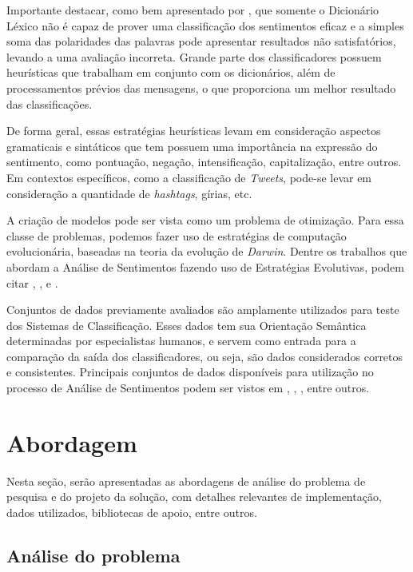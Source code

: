 \documentclass[12pt]{article}
\begin{document}
Importante destacar, como bem apresentado por \cite{araujo2013metodos}, que somente o Dicionário Léxico não é capaz de prover uma classificação dos sentimentos eficaz e a simples soma das polaridades das palavras pode apresentar resultados não satisfatórios, levando a uma avaliação incorreta. Grande parte dos classificadores possuem heurísticas que trabalham em conjunto com os dicionários, além de processamentos prévios das mensagens, o que proporciona um melhor resultado das classificações.

De forma geral, essas estratégias heurísticas levam em consideração aspectos gramaticais e sintáticos que tem possuem uma importância na expressão do sentimento, como pontuação, negação, intensificação, capitalização, entre outros. Em contextos específicos, como a classificação de \emph{Tweets}, pode-se levar em consideração a quantidade de \emph{hashtags}, gírias, etc.

A criação de modelos pode ser vista como um problema de otimização. Para essa classe de problemas, podemos fazer uso de estratégias de computação evolucionária, baseadas na teoria da evolução de \emph{Darwin}. Dentre os trabalhos que abordam a Análise de Sentimentos fazendo uso de Estratégias Evolutivas, podem citar \cite{ferreira2015using}, \cite{vohra2013comparative}, \cite{HADDI2013} e \cite{silveirageraccao}.

Conjuntos de dados previamente avaliados são amplamente utilizados para teste dos Sistemas de Classificação. Esses dados tem sua Orientação Semântica determinadas por especialistas humanos, e servem como entrada para a comparação da saída dos classificadores, ou seja, são dados considerados corretos e consistentes. Principais conjuntos de dados disponíveis para utilização no processo de Análise de Sentimentos podem ser vistos em \cite{HuAndLiu2004}, \cite{Iqbal}, \cite{taboada2011lexicon}, entre outros. 


\section{Abordagem}
Nesta seção, serão apresentadas as abordagens de análise do problema de pesquisa e do projeto da solução, com detalhes relevantes de implementação, dados utilizados, bibliotecas de apoio, entre outros.

\subsection{Análise do problema}
\end{document}
